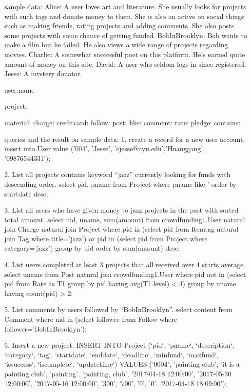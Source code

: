 sample data:
Alice: A user loves art and literature. She usually looks for projects with such tags and donate money to them. She is also an active on social things such as making friends, rating projects and  adding comments. She also posts some projects with some chance of getting funded.
BobInBrooklyn: Bob wants to make a film but he failed. He also views a wide range of projects regarding movies.
Charlie: A somewhat successful poet on this platform. He’s earned quite amount of money on this site.
David: A user who seldom logs in since registered.
Jesse: A mystery donator. 

user:name

project:

material: 
charge:
creditcard:
follow: 
post:
like:
comment:
rate:
pledge:
contains:

queries and the result on sample data:
1. create a record for a new user account.
insert into User value ('004', 'Jesse', 'cjesse@nyu.edu','Huanggang', '09876544331');
 
2. List all projects contains keyword “jazz” currently looking for funds with descending order.
select pid, pname
from Project
where pname like '%
order by startdate desc;
 
3. List all users who have given money to jazz projects in the past with sorted total amount.
select uid, uname, sum(amount)
from crowdfunding1.User natural join Charge natural join Project
where pid in (select pid
   	        from Itemtag natural join Tag
   	        where title='jazz')
or pid in (select pid
   	 	from Project
            where category='jazz')
group by uid
order by sum(amount) desc;
 
4. List users completed at least 3 projects that all received over 4 starts average.
select uname
from Post natural join crowdfunding1.User
where pid not in (select pid
          	 	from Rate as T1
                  group by pid
                  having avg(T1.level) < 4)
group by uname
having count(pid) > 2;
 
5. List comments by users followed by “BobInBrooklyn”.
select content
from Comment
where uid in (select followee
   	        from Follow
               where follower='BobInBrooklyn');
 
 
6. Insert a new project.
INSERT INTO Project
(`pid`, `pname`, `description`, `category`, `tag`, `startdate`, `enddate`, `deadline`, `minfund`, `maxfund`, `issuccess`, `iscomplete`, `updatetime`)
VALUES ('0004', 'painting club', 'it is a painting club', 'painting', 'painting, club', '2017-04-18 12:00:00', '2017-05-30 12:00:00', '2017-05-16 12:00:00', '300', '700', '0', '0', '2017-04-18 18:09:00');
 
